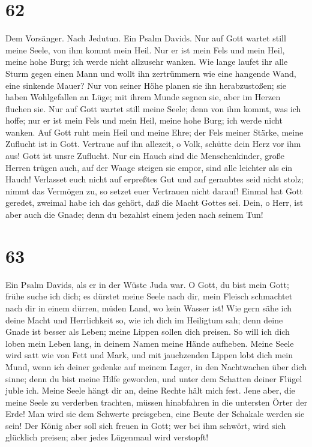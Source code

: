 \hypertarget{section-61}{%
\section{62}\label{section-61}}

 Dem Vorsänger. Nach Jedutun. Ein Psalm Davids. Nur auf
Gott wartet still meine Seele, von ihm kommt mein Heil. 
Nur er ist mein Fels und mein Heil, meine hohe Burg; ich werde nicht
allzusehr wanken.  Wie lange laufet ihr alle Sturm gegen
einen Mann und wollt ihn zertrümmern wie eine hangende Wand, eine
sinkende Mauer?  Nur von seiner Höhe planen sie ihn
herabzustoßen; sie haben Wohlgefallen an Lüge; mit ihrem Munde segnen
sie, aber im Herzen fluchen sie.  Nur auf Gott wartet
still meine Seele; denn von ihm kommt, was ich hoffe;  nur
er ist mein Fels und mein Heil, meine hohe Burg; ich werde nicht wanken.
 Auf Gott ruht mein Heil und meine Ehre; der Fels meiner
Stärke, meine Zuflucht ist in Gott.  Vertraue auf ihn
allezeit, o Volk, schütte dein Herz vor ihm aus! Gott ist unsre
Zuflucht.  Nur ein Hauch sind die Menschenkinder, große
Herren trügen auch, auf der Waage steigen sie empor, sind alle leichter
als ein Hauch!  Verlasset euch nicht auf erpreßtes Gut
und auf geraubtes seid nicht stolz; nimmt das Vermögen zu, so setzet
euer Vertrauen nicht darauf!  Einmal hat Gott geredet,
zweimal habe ich das gehört, daß die Macht Gottes sei. 
Dein, o Herr, ist aber auch die Gnade; denn du bezahlst einem jeden nach
seinem Tun!

\hypertarget{section-62}{%
\section{63}\label{section-62}}

 Ein Psalm Davids, als er in der Wüste Juda war. O Gott,
du bist mein Gott; frühe suche ich dich; es dürstet meine Seele nach
dir, mein Fleisch schmachtet nach dir in einem dürren, müden Land, wo
kein Wasser ist!  Wie gern sähe ich deine Macht und
Herrlichkeit so, wie ich dich im Heiligtum sah;  denn
deine Gnade ist besser als Leben; meine Lippen sollen dich preisen.
 So will ich dich loben mein Leben lang, in deinem Namen
meine Hände aufheben.  Meine Seele wird satt wie von Fett
und Mark, und mit jauchzenden Lippen lobt dich mein Mund, 
wenn ich deiner gedenke auf meinem Lager, in den Nachtwachen über dich
sinne;  denn du bist meine Hilfe geworden, und unter dem
Schatten deiner Flügel juble ich.  Meine Seele hängt dir
an, deine Rechte hält mich fest.  Jene aber, die meine
Seele zu verderben trachten, müssen hinabfahren in die untersten Örter
der Erde!  Man wird sie dem Schwerte preisgeben, eine
Beute der Schakale werden sie sein!  Der König aber soll
sich freuen in Gott; wer bei ihm schwört, wird sich glücklich preisen;
aber jedes Lügenmaul wird verstopft!

